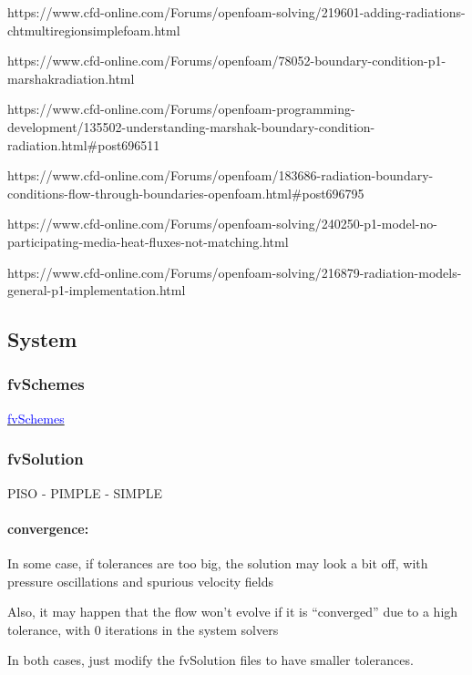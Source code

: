 \documentclass[a4paper, 12pt]{article}
\numberwithin{equation}{section}
\newcommand{\code}{\fontfamily{pcr}\selectfont}
\newcommand{\blue}[1]{\textcolor{blue}{#1}}
\begin{document}
	        https://www.cfd-online.com/Forums/openfoam-solving/219601-adding-radiations-chtmultiregionsimplefoam.html

	        https://www.cfd-online.com/Forums/openfoam/78052-boundary-condition-p1-marshakradiation.html

	        https://www.cfd-online.com/Forums/openfoam-programming-development/135502-understanding-marshak-boundary-condition-radiation.html\#post696511

	        https://www.cfd-online.com/Forums/openfoam/183686-radiation-boundary-conditions-flow-through-boundaries-openfoam.html\#post696795

	        https://www.cfd-online.com/Forums/openfoam-solving/240250-p1-model-no-participating-media-heat-fluxes-not-matching.html

	        https://www.cfd-online.com/Forums/openfoam-solving/216879-radiation-models-general-p1-implementation.html

    \subsection{System}

    \subsubsection{fvSchemes}

        \href{https://www.wolfdynamics.com/training/introOF8/supplement_tipsandtricks.pdf}{\blue{fvSchemes}}

    \subsubsection{fvSolution}

        PISO - PIMPLE - SIMPLE

        \paragraph{convergence:\\}
            In some case, if tolerances are too big, the solution may look a bit off, with pressure oscillations and spurious velocity fields

            Also, it may happen that the flow won't evolve if it is ``converged'' due to a high tolerance, with 0 iterations in the system solvers

            In both cases, just modify the {\code fvSolution} files to have smaller tolerances.
\end{document}
